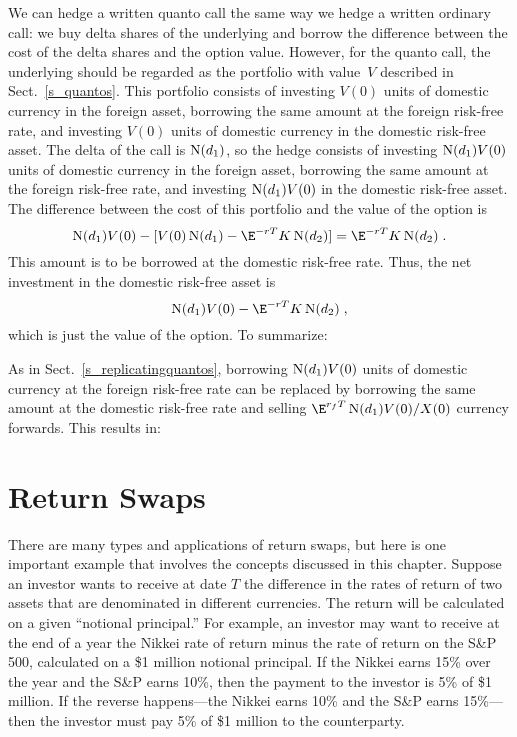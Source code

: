 We can hedge a written quanto call the same way we hedge a written ordinary call: we buy delta shares of the underlying and borrow the difference between the cost of the delta shares and the option value.  However, for the quanto call, the underlying should be regarded as the portfolio with value~$V$ described  in Sect.~\ref{s_quantos}.  This portfolio consists of investing $V(0)$ units of domestic currency in the foreign asset, borrowing the same amount at the foreign risk-free rate, and investing $V(0)$ units of domestic currency in the domestic risk-free asset.  The delta of the call is $\operatorname{N}(d_1)$, so the hedge consists of investing $\operatorname{N}(d_1)V(0)$ units of domestic currency in the foreign asset, borrowing the same amount at the foreign risk-free rate, and investing $\operatorname{N}(d_1)V(0)$ in the domestic risk-free asset.  The difference between the cost of this portfolio and the value of the option is
$$\N(d_1)V(0) - [V(0)\N(d_1) - \E^{-rT}K\N(d_2)] = \E^{-rT}K\N(d_2)\; .$$
This amount is to be borrowed at the domestic risk-free rate.  Thus, the net investment in the domestic risk-free asset is
$$\N(d_1)V(0) - \E^{-rT}K\N(d_2)\; ,$$
which is just the value of the option.  To summarize:

As in Sect.~\ref{s_replicatingquantos}, borrowing $\operatorname{N}(d_1)V(0)$ units of domestic currency at the foreign risk-free rate can be replaced by borrowing the same amount at the domestic risk-free rate and selling $\E^{r_fT}\N(d_1)V(0)/X(0)$ currency forwards.  This results in:

\section{Return Swaps}\label{s_returnswaps}
There are many types and applications of return swaps,  but here is one important example that involves the concepts discussed in this chapter.  Suppose an investor wants to receive at date $T$ the difference in the rates of return of two assets that are denominated in different currencies.  The return will be calculated on a given ``notional principal.''   For example, an investor may want to receive at the end of a year the Nikkei rate of return minus the rate of return on the S\&P 500, calculated on a \$1 million notional principal.  If the Nikkei earns 15\% over the year and the S\&P earns 10\%, then the payment to the investor is 5\% of \$1 million.  If the reverse happens---the Nikkei earns 10\% and the S\&P earns 15\%---then the investor must pay 5\% of \$1 million to the counterparty.

